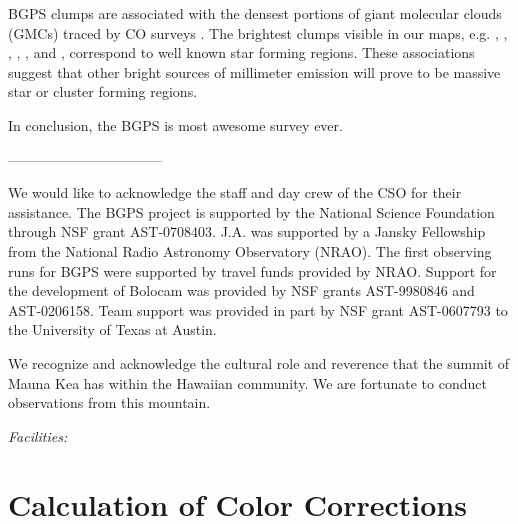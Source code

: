 \documentclass[12pt,preprint]{aastex}
\begin{document}
BGPS clumps are associated with the densest portions of giant
molecular clouds (GMCs) traced by CO surveys
\citep[e.g.,][]{dame01,FCRAO}.  The brightest clumps visible in our
maps, e.g. , , ,
, , and , correspond to well
known star forming regions.
These associations suggest that other bright sources of millimeter
emission will prove to be massive star or cluster forming regions.

In conclusion, the BGPS is most awesome survey ever.

\noindent---------------------------------

\acknowledgments

We would like to acknowledge the staff and day crew of the CSO for their
assistance. The BGPS project is supported by the National Science Foundation
through NSF grant AST-0708403. J.A. was supported by a Jansky Fellowship from
the National Radio Astronomy Observatory (NRAO). The first observing runs for
BGPS were supported by travel funds provided by NRAO. Support for the
development of Bolocam was provided by NSF grants AST-9980846 and AST-0206158.
Team support was provided in part by NSF grant AST-0607793 to the
University of Texas at Austin.

We recognize and acknowledge the cultural role and reverence that the
summit of Mauna Kea has within the Hawaiian community. We are
fortunate to conduct observations from this mountain.

{\it Facilities:} 

\appendix

\section{Calculation of Color Corrections}
\label{app:ColorCorrections}
\end{document}
